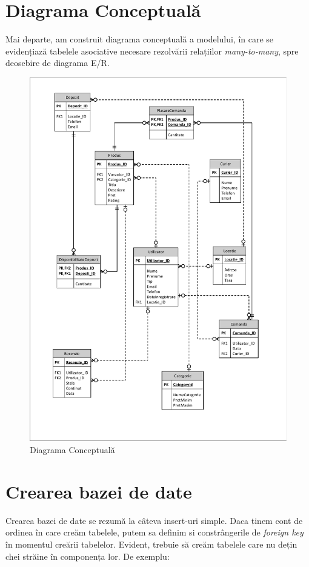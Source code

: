 \documentclass[12pt]{article}
\begin{document}
\pagebreak

\section{Diagrama Conceptuală}

Mai departe, am construit diagrama conceptuală a modelului, în care se evidențiază tabelele asociative necesare
rezolvării relațiilor \textit{many-to-many}, spre deosebire de diagrama E/R.

\begin{figure}[htp]
  \centering
  \includegraphics[width=0.72\linewidth]{DiagramaConceptuala.pdf}
  \caption{Diagrama Conceptuală}
\end{figure}

\pagebreak

\section{Crearea bazei de date}
Crearea bazei de date se rezumă la câteva insert-uri simple. Daca ținem cont de ordinea în care creăm tabelele,
putem sa definim si constrângerile de \textit{foreign key} în momentul creării tabelelor. Evident, trebuie să 
creăm tabelele care nu dețin chei străine în componența lor. De exemplu:

\vspace{0.5em}
\end{document}
